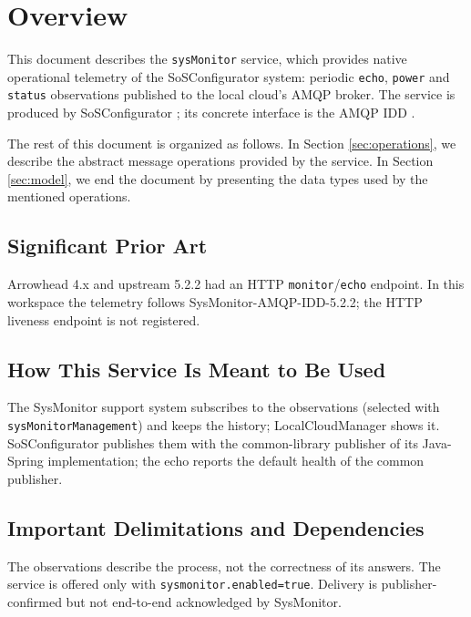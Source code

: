 \documentclass[a4paper]{arrowhead}
\begin{document}
\section{Overview}
\label{sec:overview}

This document describes the \texttt{sysMonitor} service, which provides native operational telemetry of the SoSConfigurator system: periodic \texttt{echo}, \texttt{power} and \texttt{status} observations published to the local cloud's AMQP broker.
The service is produced by SoSConfigurator \cite{sos-sysd}; its concrete interface is the AMQP IDD \cite{sos-sysMonitor-amqp-idd}.

The rest of this document is organized as follows.
In Section \ref{sec:operations}, we describe the abstract message operations provided by the service.
In Section \ref{sec:model}, we end the document by presenting the data types used by the mentioned operations.

\subsection{Significant Prior Art}

Arrowhead 4.x and upstream 5.2.2 had an HTTP \texttt{monitor}/\texttt{echo} endpoint. In this workspace the telemetry follows SysMonitor-AMQP-IDD-5.2.2; the HTTP liveness endpoint is not registered.

\subsection{How This Service Is Meant to Be Used}

The SysMonitor support system subscribes to the observations (selected with \texttt{sys\allowbreak{}Monitor\allowbreak{}Management}) and keeps the history; LocalCloudManager shows it. SoSConfigurator publishes them with the common-library publisher of its Java-Spring implementation; the echo reports the default health of the common publisher.

\subsection{Important Delimitations and Dependencies}
\label{sec:delimitations}

The observations describe the process, not the correctness of its answers. The service is offered only with \texttt{sysmonitor.\allowbreak{}enabled=\allowbreak{}true}. Delivery is publisher-confirmed but not end-to-end acknowledged by SysMonitor.
\end{document}
